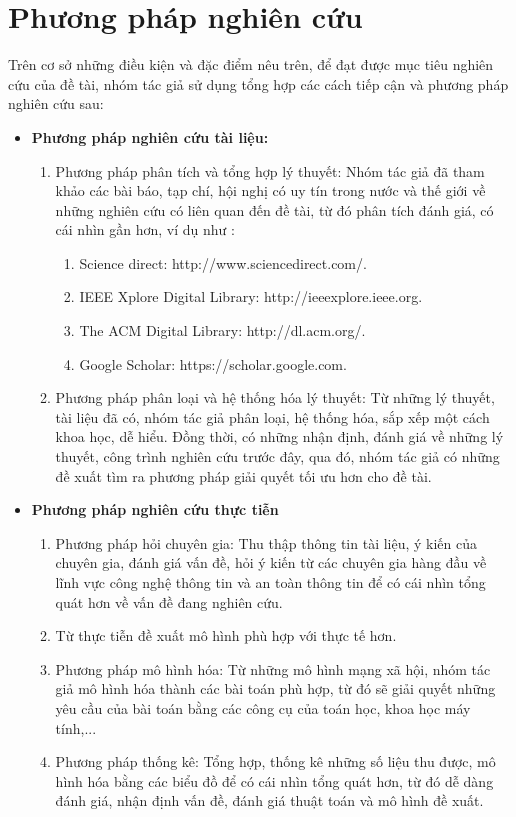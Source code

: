 \tocless\section {Phương pháp nghiên cứu}
Trên cơ sở những điều kiện và đặc điểm nêu trên, để đạt được mục tiêu nghiên cứu của đề tài, nhóm tác giả sử dụng tổng hợp các cách tiếp cận và phương pháp nghiên cứu sau:
\begin {itemize}
	\item {\bfseries Phương pháp nghiên cứu tài liệu:}
		\begin {enumerate} [+]
			\item Phương pháp phân tích và tổng hợp lý thuyết: Nhóm tác giả đã tham khảo các bài báo, tạp chí, hội nghị có uy tín trong nước và thế giới về những nghiên cứu có liên quan đến đề tài, từ đó phân tích đánh giá, có cái nhìn gần hơn, ví dụ như :
				\begin {enumerate} [$\bullet$]
					\item Science direct: http://www.sciencedirect.com/.
					\item IEEE Xplore Digital Library: http://ieeexplore.ieee.org.
					\item The ACM Digital Library: http://dl.acm.org/.
					\item Google Scholar: https://scholar.google.com.
				\end {enumerate}
			\item Phương pháp phân loại và hệ thống hóa lý thuyết: Từ những lý thuyết, tài liệu đã có, nhóm tác giả phân loại, hệ thống hóa, sắp xếp một cách khoa học, dễ hiểu. Đồng thời, có những nhận định, đánh giá về những lý thuyết, công trình nghiên cứu trước đây, qua đó, nhóm tác giả có những đề xuất tìm ra phương pháp giải quyết tối ưu hơn cho đề tài.
		\end {enumerate}
	\item {\bfseries Phương pháp nghiên cứu thực tiễn}
		\begin {enumerate} [+]
			\item Phương pháp hỏi chuyên gia: Thu thập thông tin tài liệu, ý kiến của chuyên gia, đánh giá vấn đề, hỏi ý kiến từ các chuyên gia hàng đầu về lĩnh vực công nghệ thông tin và an toàn thông tin để có cái nhìn tổng quát hơn về vấn đề đang nghiên cứu.
			\item Từ thực tiễn đề xuất mô hình phù hợp với thực tế hơn.
			\item Phương pháp mô hình hóa: Từ những mô hình mạng xã hội, nhóm tác giả mô hình hóa thành các bài toán phù hợp, từ đó sẽ giải quyết những yêu cầu của bài toán bằng các công cụ của toán học, khoa học máy tính,...
			\item Phương pháp thống kê: Tổng hợp, thống kê những số liệu thu được, mô hình hóa bằng các biểu đồ để có cái nhìn tổng quát hơn, từ đó dễ dàng đánh giá, nhận định vấn đề, đánh giá thuật toán và mô hình đề xuất.
		\end {enumerate}
\end {itemize}


